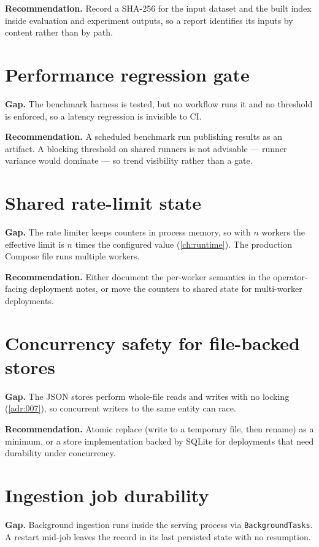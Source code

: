 \textbf{Recommendation.} Record a SHA-256 for the input dataset and the built
index inside evaluation and experiment outputs, so a report identifies its
inputs by content rather than by path.

\section{Performance regression gate}

\textbf{Gap.} The benchmark harness is tested, but no workflow runs it and no
threshold is enforced, so a latency regression is invisible to CI.

\textbf{Recommendation.} A scheduled benchmark run publishing results as an
artifact. A blocking threshold on shared runners is not advisable --- runner
variance would dominate --- so trend visibility rather than a gate.

\section{Shared rate-limit state}

\textbf{Gap.} The rate limiter keeps counters in process memory, so with $n$
workers the effective limit is $n$ times the configured value
(\cref{ch:runtime}). The production Compose file runs multiple workers.

\textbf{Recommendation.} Either document the per-worker semantics in the
operator-facing deployment notes, or move the counters to shared state for
multi-worker deployments.

\section{Concurrency safety for file-backed stores}

\textbf{Gap.} The JSON stores perform whole-file reads and writes with no
locking (\cref{adr:007}), so concurrent writers to the same entity can race.

\textbf{Recommendation.} Atomic replace (write to a temporary file, then
rename) as a minimum, or a store implementation backed by SQLite for
deployments that need durability under concurrency.

\section{Ingestion job durability}

\textbf{Gap.} Background ingestion runs inside the serving process via
\texttt{BackgroundTasks}. A restart mid-job leaves the record in its last
persisted state with no resumption.

